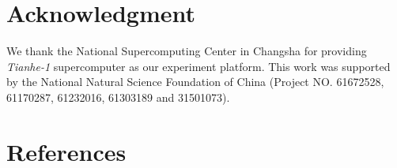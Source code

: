 \documentclass[preprint,review,11pt,a4paper]{elsarticle}
\begin{document}
\section*{Acknowledgment}
We thank the National Supercomputing Center in Changsha for providing \emph{Tianhe-1} supercomputer as our experiment platform. This work was supported by the National Natural Science Foundation of China (Project NO. 61672528, 61170287, 61232016, 61303189 and 31501073).

\section*{References}


\end{document}
